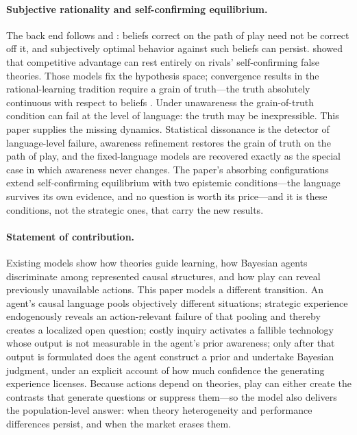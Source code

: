 \documentclass[11pt]{article}
\theoremstyle{definition}
\begin{document}
\paragraph{Subjective rationality and self-confirming equilibrium.}
The back end follows \citet{KalaiLehrer1993b} and \citet{FudenbergLevine1993}:
beliefs correct on the path of play need not be correct off it, and
subjectively optimal behavior against such beliefs can persist.
\citet{Ryall2003} showed that competitive advantage can rest entirely on
rivals' self-confirming false theories.  Those models fix the hypothesis
space; convergence results in the rational-learning tradition require a grain
of truth---the truth absolutely continuous with respect to beliefs
\citep{KalaiLehrer1993a}.  Under unawareness the grain-of-truth condition can
fail at the level of language: the truth may be inexpressible.  This paper
supplies the missing dynamics.  Statistical dissonance is the detector of
language-level failure, awareness refinement restores the grain of truth on
the path of play, and the fixed-language models are recovered exactly as the
special case in which awareness never changes.  The paper's absorbing
configurations extend self-confirming equilibrium with two epistemic
conditions---the language survives its own evidence, and no question is worth
its price---and it is these conditions, not the strategic ones, that carry
the new results.

\paragraph{Statement of contribution.}
Existing models show how theories guide learning, how Bayesian agents
discriminate among represented causal structures, and how play can reveal
previously unavailable actions.  This paper models a different transition.
An agent's causal language pools objectively different situations;
strategic experience endogenously reveals an action-relevant failure of that
pooling and thereby creates a localized open question; costly inquiry
activates a fallible technology whose output is not measurable in the agent's
prior awareness; only after that output is formulated does the agent
construct a prior and undertake Bayesian judgment, under an explicit account
of how much confidence the generating experience licenses.  Because actions
depend on theories, play can either create the contrasts that generate
questions or suppress them---so the model also delivers the population-level
answer: when theory heterogeneity and performance differences persist, and
when the market erases them.
\end{document}
